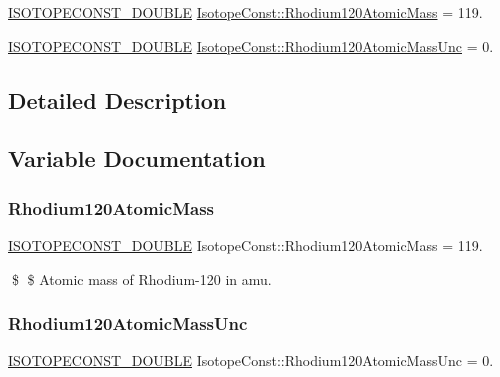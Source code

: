 \begin{DoxyCompactItemize}
\item 
\mbox{\hyperlink{group___isotope_const-_macros_ga8f45a7272ce02c0b4c65c44636ed719a}{I\+S\+O\+T\+O\+P\+E\+C\+O\+N\+S\+T\+\_\+\+D\+O\+U\+B\+LE}} \mbox{\hyperlink{group___isotope_const-_rhodium-_rh120_gaac2e418545ea7c9c804a33dc80c62f6a}{Isotope\+Const\+::\+Rhodium120\+Atomic\+Mass}} = 119.
\item 
\mbox{\hyperlink{group___isotope_const-_macros_ga8f45a7272ce02c0b4c65c44636ed719a}{I\+S\+O\+T\+O\+P\+E\+C\+O\+N\+S\+T\+\_\+\+D\+O\+U\+B\+LE}} \mbox{\hyperlink{group___isotope_const-_rhodium-_rh120_gae00bc6c01f7fed1ed76ca33a04635442}{Isotope\+Const\+::\+Rhodium120\+Atomic\+Mass\+Unc}} = 0.
\end{DoxyCompactItemize}


\subsection{Detailed Description}


\subsection{Variable Documentation}
\mbox{\label{group___isotope_const-_rhodium-_rh120_gaac2e418545ea7c9c804a33dc80c62f6a}} 
\subsubsection{\texorpdfstring{Rhodium120\+Atomic\+Mass}{Rhodium120AtomicMass}}
{\footnotesize\ttfamily \mbox{\hyperlink{group___isotope_const-_macros_ga8f45a7272ce02c0b4c65c44636ed719a}{I\+S\+O\+T\+O\+P\+E\+C\+O\+N\+S\+T\+\_\+\+D\+O\+U\+B\+LE}} Isotope\+Const\+::\+Rhodium120\+Atomic\+Mass = 119.}

\$ \$ Atomic mass of Rhodium-\/120 in amu. \mbox{\label{group___isotope_const-_rhodium-_rh120_gae00bc6c01f7fed1ed76ca33a04635442}} 
\subsubsection{\texorpdfstring{Rhodium120\+Atomic\+Mass\+Unc}{Rhodium120AtomicMassUnc}}
{\footnotesize\ttfamily \mbox{\hyperlink{group___isotope_const-_macros_ga8f45a7272ce02c0b4c65c44636ed719a}{I\+S\+O\+T\+O\+P\+E\+C\+O\+N\+S\+T\+\_\+\+D\+O\+U\+B\+LE}} Isotope\+Const\+::\+Rhodium120\+Atomic\+Mass\+Unc = 0.}

